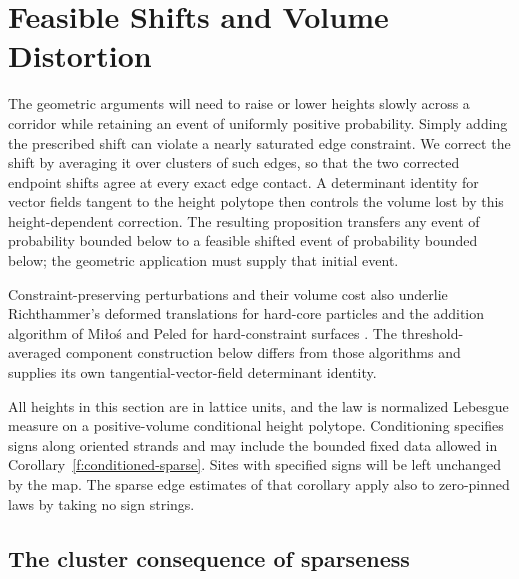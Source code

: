\section{Feasible Shifts and Volume Distortion}
\label{sec:feasible-shifts}

The geometric arguments will need to raise or lower heights slowly across
a corridor while retaining an event of uniformly positive probability.
Simply adding the prescribed shift can violate a nearly saturated edge
constraint. We correct the shift by averaging it over clusters of such
edges, so that the two corrected endpoint shifts agree at every exact
edge contact. A
determinant identity for vector fields tangent to the height polytope
then controls the volume lost by this height-dependent correction.
The resulting proposition transfers any event of probability bounded
below to a feasible shifted event of probability bounded below; the
geometric application must supply that initial event.

Constraint-preserving perturbations and their volume cost also underlie
Richthammer's deformed translations for hard-core particles
\cite[Sections~5.4 and~6.5--6.7]{Richthammer} and the addition algorithm
of Mi\l o\'s and Peled for hard-constraint surfaces
\cite[Sections~1.1.2 and~2]{MilosPeled}. The threshold-averaged component
construction below differs from those algorithms and supplies its own
tangential-vector-field determinant identity.

All heights in this section are in lattice units, and the law is
normalized Lebesgue measure on a positive-volume conditional height
polytope. Conditioning specifies signs along oriented strands and may
include the bounded fixed data allowed in
Corollary~\ref{f:conditioned-sparse}. Sites with specified signs will
be left unchanged by the map. The sparse edge estimates of that
corollary apply also to zero-pinned laws by taking no sign strings.

\subsection{The cluster consequence of sparseness}

